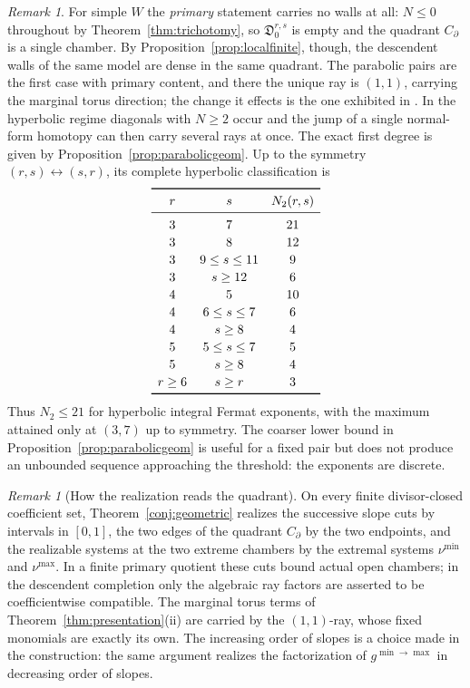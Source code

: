 \documentclass[11pt]{amsart}
\theoremstyle{definition}
\theoremstyle{remark}
\newtheorem{remark}[theorem]{Remark}
\newcommand{\Dscr}{\mathfrak{D}}
\begin{document}
\begin{remark}
\label{rem:thresholdgeom}
For simple $W$ the \emph{primary} statement carries no walls at all: $N\le0$
throughout by Theorem~\ref{thm:trichotomy}, so $\Dscr^{r,s}_{0}$ is empty and
the quadrant $C_\partial$ is a single chamber. By
Proposition~\ref{prop:localfinite}, though, the descendent walls of the same
model are dense in the same quadrant. The parabolic pairs are the first
case with primary content, and there the unique
ray is $(1,1)$, carrying the marginal torus direction; the change it effects is
the one exhibited in \cite[Ex.~4.9]{GKTsurvey}. In the hyperbolic regime diagonals
with $N\ge2$ occur and the jump of a single normal-form homotopy can then carry
several rays at once.
The exact first degree is given by Proposition~\ref{prop:parabolicgeom}.
Up to the symmetry $(r,s)\leftrightarrow(s,r)$, its complete hyperbolic
classification is
\[
\renewcommand{\arraystretch}{1.15}
\begin{array}{ccc}
\toprule
r&s&N_2(r,s)\\
\midrule
3&7&21\\
3&8&12\\
3&9\le s\le11&9\\
3&s\ge12&6\\
4&5&10\\
4&6\le s\le7&6\\
4&s\ge8&4\\
5&5\le s\le7&5\\
5&s\ge8&4\\
r\ge6&s\ge r&3\\
\bottomrule
\end{array}
\]
Thus $N_2\le21$ for hyperbolic integral Fermat exponents, with the maximum attained only
at $(3,7)$ up to symmetry. The coarser lower bound in
Proposition~\ref{prop:parabolicgeom} is useful for a fixed pair but does not
produce an unbounded sequence approaching the threshold: the exponents are
discrete.
\end{remark}

\begin{remark}[How the realization reads the quadrant]
\label{rem:conjform}
On every finite divisor-closed coefficient set,
Theorem~\ref{conj:geometric} realizes the successive slope cuts by intervals
in $[0,1]$, the two edges of the quadrant $C_\partial$ by the two endpoints,
and the realizable systems at the two extreme chambers by the extremal systems
$\nu^{\min}$ and $\nu^{\max}$.  In a finite primary
quotient these cuts bound actual open chambers; in the descendent completion
only the algebraic ray factors are asserted to be coefficientwise compatible.
The marginal torus terms of
Theorem~\ref{thm:presentation}(ii) are carried by the $(1,1)$-ray, whose fixed
monomials are exactly its own.  The increasing order of slopes is a choice made in the construction: the same argument realizes the factorization of
$g^{\min\to\max}$ in decreasing order of slopes.
\end{remark}
\end{document}
